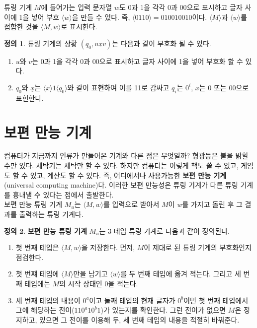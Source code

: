 \documentclass[b5paper, 11pt]{book}
\theoremstyle{definition}
\newtheorem{defn}{정의}[chapter]
\begin{document}
튜링 기계 $M$에 들어가는 입력 문자열 $w$도 0과 1을 각각 0과 00으로 표시하고 글자 사이에 1을 넣어 부호 $\langle w \rangle$을 만들 수 있다. 즉, $\langle 0110 \rangle = 010010010$이다. $\langle M \rangle$과 $\langle w \rangle$를 접합한 것을 $\langle M, w \rangle$로 표시한다.
\begin{defn}
    튜링 기계의 상황 $(q_0, u\underline{x}v)$는 다음과 같이 부호화 될 수 있다.
    \begin{enumerate}
        \item $u$와 $v$는 0과 1을 각각 0과 00으로 표시하고 글자 사이에 1을 넣어 부호화 할 수 있다.
        \item $q_0$와 $\underline{x}$는 $\langle x\rangle 1 \langle q_0\rangle$와 같이 표현하여 이를 11로 감싸고 $q_i$는 $0^i$, $x$는 0 또는 00으로 표현한다.
    \end{enumerate}
\end{defn} 
\section{보편 만능 기계}
컴퓨터가 지금까지 인류가 만들어온 기계와 다른 점은 무엇일까? 형광등은 불을 밝힐 수만 있다. 세탁기는 세탁만 할 수 있다. 하지만 컴퓨터는 이렇게 책도 쓸 수 있고, 게임도 할 수 있고, 계산도 할 수 있다. 즉, 어디에서나 사용가능한 \textbf{보편 만능 기계}(universal computing machine)다. 이러한 보편 만능성은 튜링 기계가 다른 튜링 기계를 흉내낼 수 있다는 점에서 출발한다. \\ 
보편 만능 튜링 기계 $M_u$는 $\langle M, w\rangle$를 입력으로 받아서 $M$이 $w$를 가지고 돌린 후
그 결과를 출력하는 튜링 기계다. 
\begin{defn}
    \textbf{보편 만능 튜링 기계} $M_u$는 3-테입 튜링 기계로 다음과 같이 정의된다.
    \begin{enumerate}
        \item 첫 번째 테입은 $\langle M, w \rangle$을 저장한다. 먼저, $M$이 제대로 된 튜링 기계의 부호화인지 점검한다. 
        \item 첫 번쨰 테입에 $\langle M \rangle$만을 남기고 $\langle w \rangle$를 두 번째 테입에 옮겨 적는다. 그리고 세 번째 테입에는 $M$의 시작 상태인 $0$을 적는다. 
        \item 세 번째 테입의 내용이 $0^a$이고 둘째 테입의 현재 글자가 $0^b$이면 첫 번째 테입에서 그에 해당하는 전이($110^a10^b1$)가 있는지를 확인한다. 그런 전이가 없으면 $M$은 정지하고, 있으면 그 전이를 이용해 두, 세 번째 테입의 내용을 적절히 바꿔준다. 
    \end{enumerate}
\end{defn}
\end{document}
